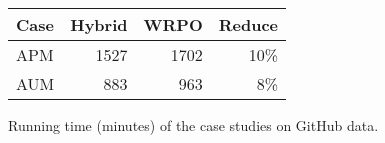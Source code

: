\begin{figure}
\centering
\scriptsize
\setlength{\tabcolsep}{4pt}
\begin{tabular}{lrrr}
\toprule
Case & Hybrid & WRPO & Reduce \\
\midrule
APM & 1527 & 1702 & 10\% \\
AUM & 883 & 963 & 8\% \\
\bottomrule
\end{tabular}%
\caption{Running time (minutes) of the case studies on GitHub data.}
\label{fig:case-study-table}
\end{figure}